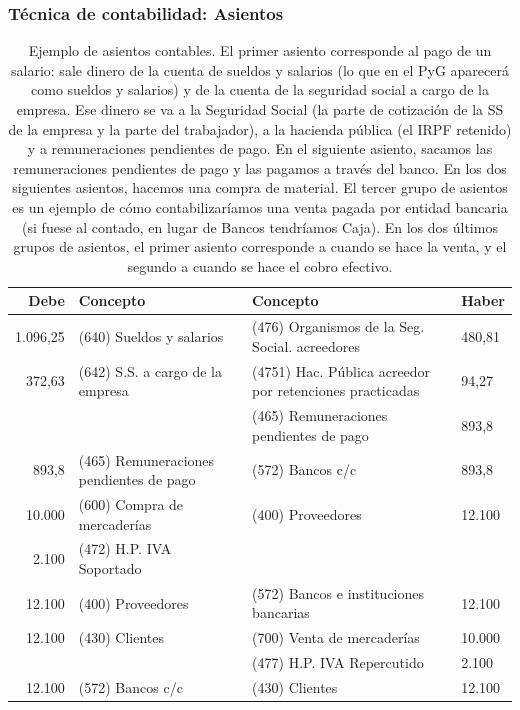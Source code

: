 \documentclass[nochap,palatino,notitlepage]{apuntes}
\begin{document}
\subsubsection{Técnica de contabilidad: Asientos}

\begin{table}[hbtp]
\centering
\begin{tabular}{r|p{5cm}||p{5cm}|l}
\textbf{Debe} & \textbf{Concepto} & \textbf{Concepto} & \textbf{Haber} \\ \toprule
1.096,25 & (640) Sueldos y salarios & (476) Organismos de la Seg. Social. acreedores & 480,81 \\
372,63 & (642) S.S. a cargo de la empresa & (4751) Hac. Pública acreedor por retenciones practicadas & 94,27 \\
 & & (465) Remuneraciones pendientes de pago & 893,8 \\ \midrule
 893,8 & (465) Remuneraciones pendientes de pago & (572) Bancos c/c & 893,8 \\ \midrule \midrule
10.000 	& (600) Compra de mercaderías & (400) Proveedores &	12.100 \\
2.100 	& (472) H.P. IVA Soportado & &  \\ \midrule
12.100 	& (400) Proveedores & (572) Bancos e instituciones bancarias &	12.100 \\ \midrule \midrule
12.100 	& (430) Clientes & 	 (700) Venta de mercaderías & 10.000 \\
 & & (477) H.P. IVA Repercutido & 2.100 \\ \midrule
12.100 & (572) Bancos c/c & (430) Clientes & 12.100 \\
 \bottomrule
\end{tabular}
\caption{Ejemplo de asientos contables. El primer asiento corresponde al pago de un salario: sale dinero de la cuenta de sueldos y salarios (lo que en el PyG aparecerá como sueldos y salarios) y de la cuenta de la seguridad social a cargo de la empresa. Ese dinero se va a la Seguridad Social (la parte de cotización de la SS de la empresa y la parte del trabajador), a la hacienda pública (el IRPF retenido) y a remuneraciones pendientes de pago. En el siguiente asiento, sacamos las remuneraciones pendientes de pago y las pagamos a través del banco. En los dos siguientes asientos, hacemos una compra de material. El tercer grupo de asientos es un ejemplo de cómo contabilizaríamos una venta pagada por entidad bancaria (si fuese al contado, en lugar de Bancos tendríamos Caja). En los dos últimos grupos de asientos, el primer asiento corresponde a cuando se hace la venta, y el segundo a cuando se hace el cobro efectivo.}
\label{tab:Asientos}
\end{table}
\end{document}

